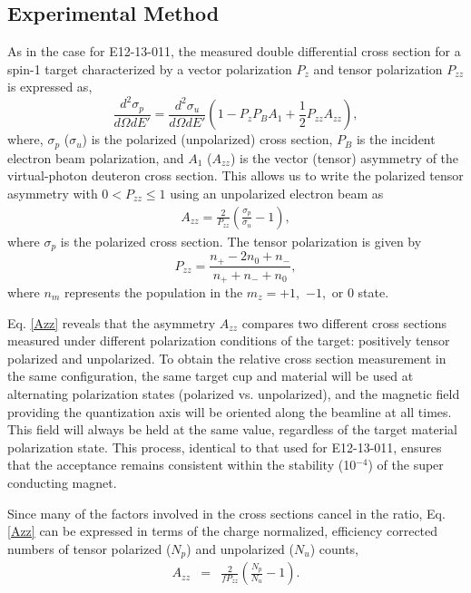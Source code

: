 \subsection{Experimental Method} %

As in the case for E12-13-011, the measured double differential cross section for a spin-1 target characterized by a vector polarization $P_{z}$ and tensor polarization
$P_{zz}$ is expressed as,
\begin{equation}
\frac{d^2\sigma_p}{d\Omega dE'}=\frac{d^2\sigma_u}{d\Omega dE'}\left(1-P_zP_BA_1+\frac{1}{2}P_{zz}A_{zz}\right),
\label{eq:one}
\end{equation}
where, $\sigma_p$ ($\sigma_u$) is the polarized (unpolarized) cross section, $P_B$ is the incident electron beam polarization, and $A_1$ ($A_{zz}$) is the
vector (tensor) asymmetry of the virtual-photon deuteron cross section.  This allows us to write
the polarized tensor asymmetry with $0<P_{zz}\leq 1$ using an unpolarized electron beam as
\begin{eqnarray}
\label{Azz}
A_{zz} = \frac{2}{P_{zz}}\left(\frac{\sigma_p}{\sigma_u} - 1\right),
\end{eqnarray}
where $\sigma_p$ is the polarized cross section. The tensor polarization is given by 
\begin{equation}
P_{zz}=\frac{n_+-2n_0+n_-}{n_++n_-+n_0},
\end{equation}
where $n_m$ represents the population in the $m_z=+1$,~$-1$,~or $0$ state.

Eq. \ref{Azz} reveals that the asymmetry $A_{zz}$ compares two different cross sections measured under different polarization conditions of the target: positively tensor polarized and unpolarized.  
To obtain the relative cross section measurement in the same configuration, the same target 
cup and material will be used at alternating polarization states (polarized vs. unpolarized),  
and the magnetic field providing the quantization axis will be oriented along the beamline at all times.
This field will always be held at the same value, regardless of the target material polarization state. 
This process, identical to that used for E12-13-011, ensures that the acceptance remains consistent within the stability (10$^{-4}$) of the super conducting magnet.  


Since many of the factors involved in the cross sections cancel in
the ratio, Eq. \ref{Azz} can be expressed in terms 
of the charge normalized, efficiency corrected numbers of tensor polarized ($N_p$) and unpolarized ($N_u$) counts, 
\begin{eqnarray} \label{3}
A_{zz}&=&\frac{2}{fP_{zz}}\left(\frac{N_p}{N_u}-1\right) .
\end{eqnarray}

